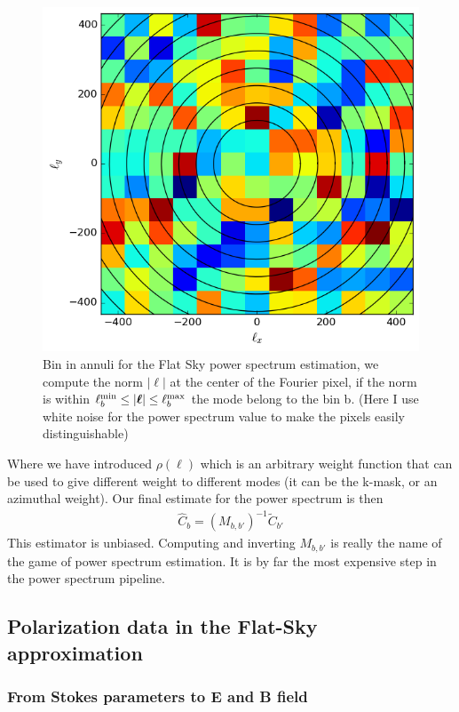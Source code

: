 \documentclass[a4paper, 11pt]{article}
\def\ba{\begin{eqnarray}}
\def\ea{\end{eqnarray}}
\begin{document}
\begin{figure}
  \centering
  \includegraphics[width=0.5\columnwidth]{p2d.png}
  \caption{Bin in annuli for the Flat Sky power spectrum estimation, we compute the norm $|\bm{\ell}|$ at the center of the Fourier pixel, if the norm is within  $\ell^{\rm min}_{b} \leq |{\bm{\ell}| \leq \ell^{\rm max}_{b}}$  the mode belong to the bin b. (Here I use white noise for the power spectrum value to make the pixels easily distinguishable)}
  \label{fig:p2dbin}
\end{figure}



Where we have introduced $\rho(\bm{\ell})$ which is an arbitrary weight function that can be used to give different weight to different modes (it can be the k-mask, or an azimuthal weight).
Our final estimate for the power spectrum is then
\ba
\hat{C}_{b}= (M_{b, b'})^{-1} \tilde{C}_{b'} 
\ea
This estimator is unbiased. Computing and inverting $M_{b, b'}$ is really the name of the game of power spectrum estimation. It is by far the most expensive step in the power spectrum pipeline.

\subsection{Polarization data in the Flat-Sky approximation}

\subsubsection{From Stokes parameters to E and B field}
\end{document}
